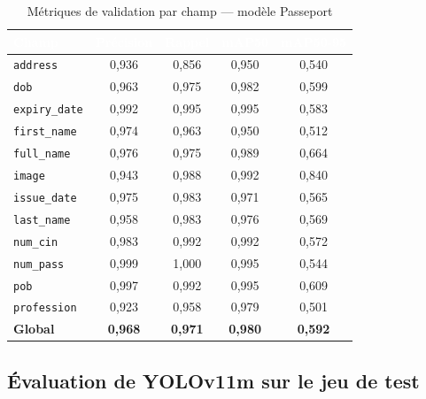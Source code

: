 \begin{table}[H]
  \centering
  \small
  \begin{tabular}{|l|c|c|c|c|}
    \toprule
    \rowcolor{bleu_principal}
    \textcolor{white}{\textbf{Champ}} & \textcolor{white}{\textbf{Précision}} & \textcolor{white}{\textbf{Rappel}} & \textcolor{white}{\textbf{mAP50}} & \textcolor{white}{\textbf{mAP50-95}} \\
    \midrule
    \texttt{address}     & 0,936 & 0,856 & 0,950 & 0,540 \\
    \midrule
    \rowcolor{gris_leger}
    \texttt{dob}         & 0,963 & 0,975 & 0,982 & 0,599 \\
    \midrule
    \texttt{expiry\_date}& 0,992 & 0,995 & 0,995 & 0,583 \\
    \midrule
    \rowcolor{gris_leger}
    \texttt{first\_name} & 0,974 & 0,963 & 0,950 & 0,512 \\
    \midrule
    \texttt{full\_name}  & 0,976 & 0,975 & 0,989 & 0,664 \\
    \midrule
    \rowcolor{gris_leger}
    \texttt{image}       & 0,943 & 0,988 & 0,992 & 0,840 \\
    \midrule
    \texttt{issue\_date} & 0,975 & 0,983 & 0,971 & 0,565 \\
    \midrule
    \rowcolor{gris_leger}
    \texttt{last\_name}  & 0,958 & 0,983 & 0,976 & 0,569 \\
    \midrule
    \texttt{num\_cin}    & 0,983 & 0,992 & 0,992 & 0,572 \\
    \midrule
    \rowcolor{gris_leger}
    \texttt{num\_pass}   & 0,999 & 1,000 & 0,995 & 0,544 \\
    \midrule
    \texttt{pob}         & 0,997 & 0,992 & 0,995 & 0,609 \\
    \midrule
    \rowcolor{gris_leger}
    \texttt{profession}  & 0,923 & 0,958 & 0,979 & 0,501 \\
    \midrule
    \rowcolor{bleu_clair!15}
    \textbf{Global}      & \textbf{0,968} & \textbf{0,971} & \textbf{0,980} & \textbf{0,592} \\
    \bottomrule
  \end{tabular}
  \caption{Métriques de validation par champ --- modèle Passeport}
  \label{tab:ch3-metrics-passport}
\end{table}

\subsection{Évaluation de YOLOv11m sur le jeu de test}
\label{subsec:evaluation-yolo-test}


